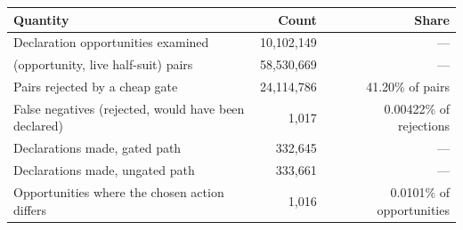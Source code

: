 \begin{tabular}{lrr}
\toprule
Quantity & Count & Share \\
\midrule
Declaration opportunities examined & 10{,}102{,}149 & --- \\
(opportunity, live half-suit) pairs & 58{,}530{,}669 & --- \\
Pairs rejected by a cheap gate & 24{,}114{,}786 & 41.20\% of pairs \\
\midrule
False negatives (rejected, would have been declared) & 1{,}017 & 0.00422\% of rejections \\
Declarations made, gated path & 332{,}645 & --- \\
Declarations made, ungated path & 333{,}661 & --- \\
Opportunities where the chosen action differs & 1{,}016 & 0.0101\% of opportunities \\
\bottomrule
\end{tabular}